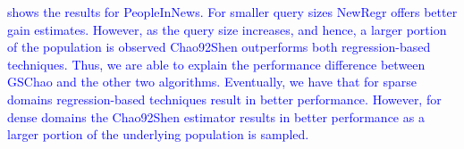 \textcolor{blue}{ shows the results for PeopleInNews. For smaller query sizes NewRegr offers better gain estimates. However, as the query size increases, and hence, a larger portion of the population is observed Chao92Shen outperforms both regression-based techniques. Thus, we are able to explain the performance difference between GSChao and the other two algorithms. Eventually, we have that for sparse domains regression-based techniques result in better performance. However, for dense domains the Chao92Shen estimator results in better performance as a larger portion of the underlying population is sampled.}





